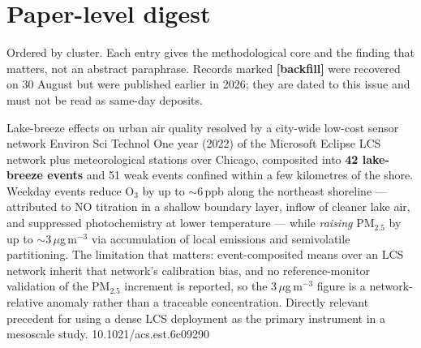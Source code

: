 \documentclass[10pt]{article}
\begin{document}
\clearpage

\section*{\sffamily\bfseries\color{Deep}Paper-level digest}
\vspace{-1.5mm}{\color{Amber}\rule{\linewidth}{1.1pt}}\vspace{1mm}

{\fontsize{7.4}{9}\selectfont\color{Slate}Ordered by cluster. Each entry gives the
methodological core and the finding that matters, not an abstract paraphrase. Records
marked \textbf{[backfill]} were recovered on 30 August but were published earlier in 2026;
they are dated to this issue and must not be read as same-day deposits.\par}


{Lake-breeze effects on urban air quality resolved by a city-wide low-cost sensor network}
{Environ Sci Technol}
{One year (2022) of the Microsoft Eclipse LCS network plus meteorological stations over
Chicago, composited into \textbf{42 lake-breeze events} and 51 weak events confined within a
few kilometres of the shore. Weekday events reduce O$_3$ by up to $\sim$6\,ppb along the
northeast shoreline --- attributed to NO titration in a shallow boundary layer, inflow of
cleaner lake air, and suppressed photochemistry at lower temperature --- while
\emph{raising} PM$_{2.5}$ by up to $\sim$3\,$\mu$g\,m$^{-3}$ via accumulation of local
emissions and semivolatile partitioning. The limitation that matters: event-composited
means over an LCS network inherit that network's calibration bias, and no
reference-monitor validation of the PM$_{2.5}$ increment is reported, so the
3\,$\mu$g\,m$^{-3}$ figure is a network-relative anomaly rather than a traceable
concentration. Directly relevant precedent for using a dense LCS deployment as the primary
instrument in a mesoscale study.}
{10.1021/acs.est.6c09290}
\end{document}
